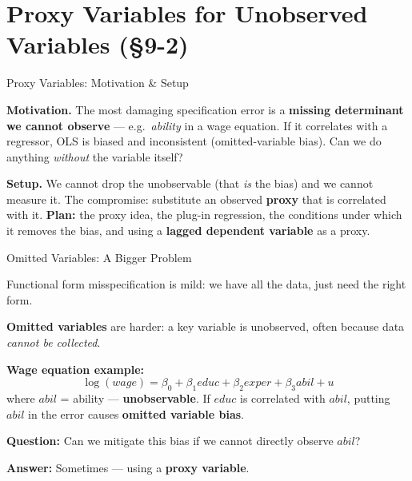 \documentclass[aspectratio=169, 12pt]{beamer}
\begin{document}
\section{Proxy Variables for Unobserved Variables (\S9-2)}

\begin{frame}{Proxy Variables: Motivation \& Setup}

  \begin{highlightbox}
    \textbf{Motivation.} The most damaging specification error is a \textbf{missing
    determinant we cannot observe} --- e.g.\ \emph{ability} in a wage equation. If it
    correlates with a regressor, OLS is biased and inconsistent (omitted-variable
    bias). Can we do anything \emph{without} the variable itself?
  \end{highlightbox}

  \begin{keybox}
    \textbf{Setup.} We cannot drop the unobservable (that \emph{is} the bias) and we
    cannot measure it. The compromise: substitute an observed \textbf{proxy} that is
    correlated with it. \textbf{Plan:} the proxy idea, the plug-in regression, the
    conditions under which it removes the bias, and using a \textbf{lagged dependent
    variable} as a proxy.
  \end{keybox}

\end{frame}

\begin{frame}{Omitted Variables: A Bigger Problem}

  Functional form misspecification is mild: we have all the data, just need the right form.

  \begin{highlightbox}
    \textbf{Omitted variables} are harder: a key variable is unobserved, often because data
    \emph{cannot be collected}.

    \medskip
    \textbf{Wage equation example:}
    \[
      \log(\mathit{wage}) = \beta_0 + \beta_1 \mathit{educ} + \beta_2 \mathit{exper} + \beta_3 \mathit{abil} + u
    \]
    where $\mathit{abil}$ = ability — \textbf{unobservable}. If $\mathit{educ}$ is correlated with $\mathit{abil}$,
    putting $\mathit{abil}$ in the error causes \textbf{omitted variable bias}.
  \end{highlightbox}

  \textbf{Question:} Can we mitigate this bias if we cannot directly observe $\mathit{abil}$?

  \textbf{Answer:} Sometimes — using a \textbf{proxy variable}.

\end{frame}
\end{document}
